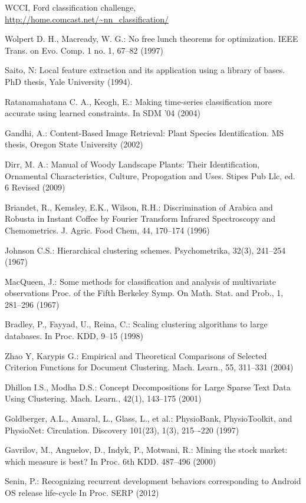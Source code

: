 \documentclass{llncs}
\begin{document}
\begin{thebibliography}{5}
WCCI, Ford classification challenge,
\url{http://home.comcast.net/~nn_classification/}

Wolpert D. H., Macready, W. G.:
No free lunch theorems for optimization.
IEEE Trans. on Evo. Comp. 1 no. 1, 67--82 (1997)

Saito, N:
Local feature extraction and its application using a library of bases. 
PhD thesis, Yale University (1994).

Ratanamahatana C. A., Keogh, E.:
Making time-series classification more accurate using learned constraints. 
In SDM '04 (2004)

Gandhi, A.:
Content-Based Image Retrieval: Plant Species Identification. 
MS thesis, Oregon State University (2002)

Dirr, M. A.:
Manual of Woody Landscape Plants: Their Identification, Ornamental Characteristics,
Culture, Propogation and Uses.
Stipes Pub Llc, ed. 6 Revised (2009)

Briandet, R., Kemsley, E.K., Wilson, R.H.:
Discrimination of Arabica and Robusta in Instant Coffee by Fourier Transform Infrared Spectroscopy
and Chemometrics.
J. Agric. Food Chem, 44, 170--174 (1996)

Johnson C.S.:
Hierarchical clustering schemes.
Psychometrika, 32(3), 241--254 (1967)

MacQueen, J.:
Some methods for classification and analysis of multivariate observations
Proc. of the Fifth Berkeley Symp. On  Math. Stat. and Prob., 1, 281--296 (1967)

Bradley, P., Fayyad, U., Reina, C.:
Scaling clustering algorithms to large databases. 
In Proc. KDD, 9--15 (1998)

Zhao Y, Karypis G.:
Empirical and Theoretical Comparisons of Selected Criterion Functions for Document Clustering.
Mach. Learn., 55, 311--331 (2004)

Dhillon I.S., Modha D.S.:
Concept Decompositions for Large Sparse Text Data Using Clustering.
Mach. Learn., 42(1), 143--175 (2001)

Goldberger, A.L., Amaral, L., Glass, L., et al.: PhysioBank, PhysioToolkit, and 
PhysioNet: Circulation. Discovery 101(23), 1(3), 215–-220 (1997) 

Gavrilov, M., Anguelov, D., Indyk, P., Motwani, R.:
Mining the stock market: which measure is best? 
In Proc. 6th KDD. 487--496 (2000)

Senin, P.: 
Recognizing recurrent development behaviors corresponding to Android OS release life-cycle
In Proc. SERP (2012)



\end{thebibliography}
\end{document}
